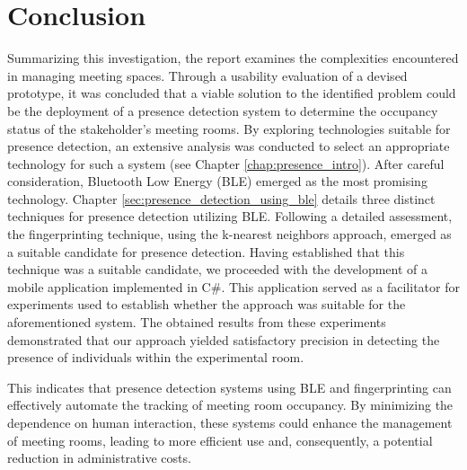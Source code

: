 \chapter{Conclusion}
Summarizing this investigation, the report examines the complexities encountered in managing meeting spaces. 
Through a usability evaluation of a devised prototype, it was concluded that a viable solution to the identified problem could be the deployment of a presence detection system to determine the occupancy status of the stakeholder's meeting rooms.
By exploring technologies suitable for presence detection, an extensive analysis was conducted to select an appropriate technology for such a system (see Chapter \ref{chap:presence_intro}). 
After careful consideration, Bluetooth Low Energy (BLE) emerged as the most promising technology. 
Chapter \ref{sec:presence_detection_using_ble} details three distinct techniques for presence detection utilizing BLE.
Following a detailed assessment, the fingerprinting technique, using the k-nearest neighbors approach, emerged as a suitable candidate for presence detection.
Having established that this technique was a suitable candidate, we proceeded with the development of a mobile application implemented in C#. 
This application served as a facilitator for experiments used to establish whether the approach was suitable for the aforementioned system. 
The obtained results from these experiments demonstrated that our approach yielded satisfactory precision in detecting the presence of individuals within the experimental room.

This indicates that presence detection systems using BLE and fingerprinting can effectively automate the tracking of meeting room occupancy.
By minimizing the dependence on human interaction, these systems could enhance the management of meeting rooms, leading to more efficient use and, consequently, a potential reduction in administrative costs.
